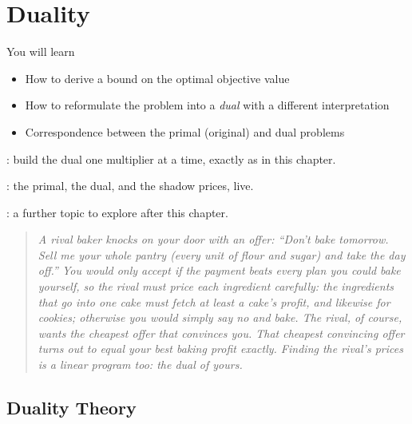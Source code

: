 

\chapter{Duality}
\label{ch:duality}

\begin{outcome}
You will learn
\begin{itemize}
\item How to derive a bound on the optimal objective value
\item How to reformulate the problem into a \emph{dual} with a different interpretation
\item Correspondence between the primal (original) and dual problems
\end{itemize}
\end{outcome}

\begin{tryit}
: build the dual one multiplier at a time, exactly as in this chapter.

: the primal, the dual, and the shadow prices, live.

: a further topic to explore after this chapter.
\end{tryit}



\begin{quote}
\itshape A rival baker knocks on your door with an offer: ``Don't bake tomorrow. Sell me your whole pantry (every unit of flour and sugar) and take the day off.'' You would only accept if the payment beats every plan you could bake yourself, so the rival must price each ingredient carefully: the ingredients that go into one cake must fetch at least a cake's profit, and likewise for cookies; otherwise you would simply say no and bake. The rival, of course, wants the cheapest offer that convinces you. That cheapest convincing offer turns out to equal your best baking profit \emph{exactly}. Finding the rival's prices is a linear program too: the \emph{dual} of yours.
\end{quote}

\section{Duality Theory}
\label{sec:duality-theory}

